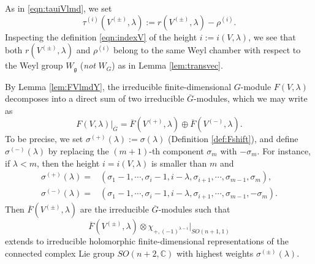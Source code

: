 As in \eqref{eqn:tauiVlmd}, 
 we set
\[
   \tau^{(i)}(V^{(\pm)},\lambda):=r(V^{(\pm)},\lambda)-\rho^{(i)}.  
\]
Inspecting the definition \eqref{eqn:indexV}
 of the height $i:=i(V,\lambda)$, 
 we see that both $r(V^{(\pm)},\lambda)$ and $\rho^{(i)}$
 belong to the same Weyl chamber
 with respect to the Weyl group $W_{\mathfrak{g}}$
 ({\it{not}} $W_G$)
 as in Lemma \ref{lem:transvec}.  



By Lemma \ref{lem:FVlmdY}, 
 the irreducible finite-dimensional $G$-module
 $F(V, \lambda)$ decomposes into a direct sum
 of two irreducible $\overline G$-modules, 
 which we may write as
\[
  F(V, \lambda)|_{\overline G}=\overline F(V^{(+)}, \lambda)
  \oplus \overline F(V^{(-)}, \lambda).  
\]
To be precise, 
 we set $\sigma^{(+)} (\lambda):=\sigma(\lambda)$
 (Definition \ref{def:Fshift}), 
 and define $\sigma^{(-)}(\lambda)$
 by replacing the $(m+1)$-th component $\sigma_m$
 with $-\sigma_m$.  
For instance,
 if $\lambda<m$, 
 then the height $i=i(V,\lambda)$ is smaller than $m$
and
\begin{align*}
\sigma^{(+)}(\lambda) =&(\sigma_1-1,\cdots,\sigma_i-1,i-\lambda, \sigma_{i+1},\cdots, \sigma_{m-1}, \sigma_{m}), 
\\
\sigma^{(-)}(\lambda) =&(\sigma_1-1,\cdots,\sigma_i-1,i-\lambda, \sigma_{i+1},\cdots, \sigma_{m-1}, -\sigma_{m}).  
\end{align*}
Then $\overline F(V^{(\pm)}, \lambda)$ are
 the irreducible $\overline G$-modules
 such that 
\[
\overline F(V^{(\pm)}, \lambda) \otimes \chi_{+,(-1)^{\lambda-i}}|_{SO(n+1,1)}
\]
 extends to irreducible holomorphic finite-dimensional representations
 of the connected complex Lie group $SO(n+2,{\mathbb{C}})$
 with highest weights $\sigma^{(\pm)}(\lambda)$.  



